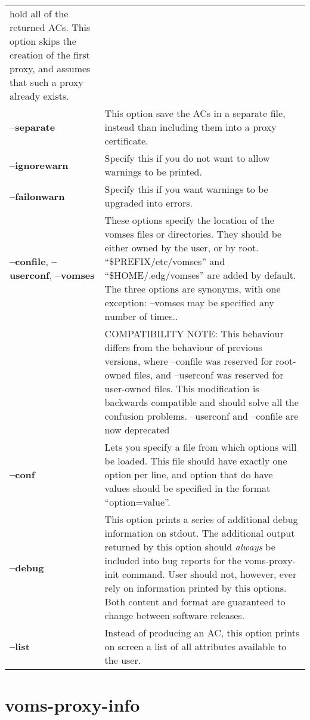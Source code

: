 \documentclass[a4paper]{book}
\begin{document}
\begin{longtable}{lp{3in}}
		      hold all of the returned ACs.  This option skips
		      the creation of the first proxy, and assumes
		      that such a proxy already exists.\\
\textbf{--separate} & This option save the ACs in a separate file,
		      instead than including them into a proxy
		      certificate.\\ 
\textbf{--ignorewarn} & Specify this if you do not want to allow
		      warnings to be printed.\\
\textbf{--failonwarn} & Specify this if you want warnings to be
		      upgraded into errors.\\
\textbf{--confile}, 
\textbf{--userconf},
\textbf{--vomses} & These options specify the location of the vomses files or directories.
                    They should be either owned by the user, or by root. ``\$PREFIX/etc/vomses''
                    and ``\$HOME/.edg/vomses'' are added by default.  The three options are synonyms,
                    with one exception: --vomses may be specified any number of times..\\
\                 & COMPATIBILITY NOTE: This behaviour differs from the behaviour of previous versions,
                    where --confile was reserved for root-owned files, and --userconf was reserved for
                    user-owned files. This modification is backwards compatible and should solve all
                    the confusion problems. --userconf and --confile are now deprecated\\
\textbf{--conf}     & Lets you specify a file from which options will
		      be loaded.  This file should have exactly one
		      option per line, and option that do have values
		      should be specified in the format
		      ``option=value''.\\ 
\textbf{--debug}    & This option prints a series of additional debug
		      information on stdout.  The additional output
		      returned by this option should \emph{always} be
		      included into bug reports for the
		      voms-proxy-init command.  User should not,
		      however, ever rely on information printed by
		      this options.  Both content and format are
		      guaranteed to change between software
		      releases.\\
\textbf{--list} & Instead of producing an AC, this option prints on screen
          a list of all attributes available to the user.\\
\end{longtable}

\chapter{voms-proxy-info}
\end{document}
